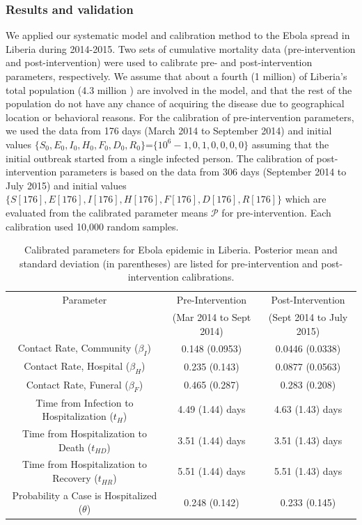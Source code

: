 \subsubsection{Results and validation}
We applied our systematic model and calibration method to the Ebola spread in Liberia during 2014-2015. Two sets of cumulative mortality data (pre-intervention and post-intervention) were used to calibrate pre- and post-intervention parameters, respectively. We assume that about a fourth (1 million) of Liberia's total population (4.3 million \cite{LiberiaPop}) are involved in the model, and that the rest of the population do not have any chance of acquiring the disease due to geographical location or behavioral reasons. For the calibration of pre-intervention parameters, we used the data from 176 days (March 2014 to September 2014) and initial values $\{S_0,E_0,I_0,H_0,F_0,D_0,R_0\}$=$\{10^6-1,0,1,0,0,0,0\}$ assuming that the initial outbreak started from a single infected person. The calibration of post-intervention parameters is based on the data from 306 days (September 2014 to July 2015) and initial values $\{S[176],E[176],I[176],H[176],F[176],D[176],R[176]\}$ which are evaluated from the calibrated parameter means $\mathcal{P}$ for pre-intervention. Each calibration used 10,000 random samples.

\begin{table}[ht]
\centering %
\begin{tabular}{c  c c}
\hline\hline %
Parameter &  Pre-Intervention  & Post-Intervention \\ [0.5ex]
 & (Mar 2014 to Sept 2014) &  (Sept 2014 to July 2015)\\ [0.5ex] %
\hline %
{Contact Rate, Community  (${\beta_{I}}$) }& {0.148 (0.0953)} & {0.0446 (0.0338)}  \\
Contact Rate, Hospital  ($\beta_{H}$) & 0.235 (0.143) & 0.0877 (0.0563) \\
Contact Rate, Funeral  ($\beta_{F}$) & 0.465 (0.287)& 0.283 (0.208) \\
Time from Infection to Hospitalization (${t_{H}}$) & 4.49 (1.44) days & 4.63 (1.43) days  \\
Time from Hospitalization to Death (${t_{HD}}$) & 3.51 (1.44) days & 3.51 (1.43) days  \\
Time from Hospitalization to Recovery (${t_{HR}}$) & 5.51 (1.44) days & 5.51 (1.43) days \\
Probability a Case is Hospitalized ($\theta$) & 0.248 (0.142) & 0.233 (0.145) \\
[1ex]
\hline
\end{tabular}
\caption{Calibrated parameters for Ebola epidemic in Liberia. Posterior mean and standard deviation (in parentheses) are listed for pre-intervention and post-intervention calibrations.}%
\label{tab:calibratedParameters}
\end{table}

